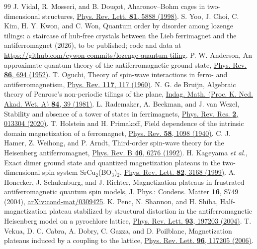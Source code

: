 \documentclass[aps,prb,twocolumn,superscriptaddress,floatfix]{revtex4-2}
\begin{document}
\begin{thebibliography}{99}
 J. Vidal, R. Mosseri, and B. Dou\c{c}ot, Aharonov--Bohm cages in two-dimensional structures, \href{https://doi.org/10.1103/PhysRevLett.81.5888}{Phys. Rev. Lett. \textbf{81}, 5888 (1998)}.
 S. Yoo, J. Choi, C. Kim, H. Y. Kwon, and C. Won, Quantum order by disorder among lozenge tilings: a staircase of hub-free crystals between the Lieb ferrimagnet and the antiferromagnet (2026), to be published; code and data at \url{https://github.com/cywon-commits/lozenge-quantum-tiling}.
 P. W. Anderson, An approximate quantum theory of the antiferromagnetic ground state, \href{https://doi.org/10.1103/PhysRev.86.694}{Phys. Rev. \textbf{86}, 694 (1952)}.
 T. Oguchi, Theory of spin-wave interactions in ferro- and antiferromagnetism, \href{https://doi.org/10.1103/PhysRev.117.117}{Phys. Rev. \textbf{117}, 117 (1960)}.
 N. G. de Bruijn, Algebraic theory of Penrose's non-periodic tilings of the plane, \href{https://doi.org/10.1016/1385-7258(81)90016-0}{Indag. Math. (Proc. K. Ned. Akad. Wet. A) \textbf{84}, 39 (1981)}.
 L. Rademaker, A. Beekman, and J. van Wezel, Stability and absence of a tower of states in ferrimagnets, \href{https://doi.org/10.1103/PhysRevResearch.2.013304}{Phys. Rev. Res. \textbf{2}, 013304 (2020)}.
 T. Holstein and H. Primakoff, Field dependence of the intrinsic domain magnetization of a ferromagnet, \href{https://doi.org/10.1103/PhysRev.58.1098}{Phys. Rev. \textbf{58}, 1098 (1940)}.
 C. J. Hamer, Z. Weihong, and P. Arndt, Third-order spin-wave theory for the Heisenberg antiferromagnet, \href{https://doi.org/10.1103/PhysRevB.46.6276}{Phys. Rev. B \textbf{46}, 6276 (1992)}.
 H. Kageyama \textit{et al.}, Exact dimer ground state and quantized magnetization plateaus in the two-dimensional spin system SrCu$_2$(BO$_3$)$_2$, \href{https://doi.org/10.1103/PhysRevLett.82.3168}{Phys. Rev. Lett. \textbf{82}, 3168 (1999)}.
 A. Honecker, J. Schulenburg, and J. Richter, Magnetization plateaus in frustrated antiferromagnetic quantum spin models, J. Phys.: Condens. Matter \textbf{16}, S749 (2004), \href{https://arxiv.org/abs/cond-mat/0309425}{arXiv:cond-mat/0309425}.
 K. Penc, N. Shannon, and H. Shiba, Half-magnetization plateau stabilized by structural distortion in the antiferromagnetic Heisenberg model on a pyrochlore lattice, \href{https://doi.org/10.1103/PhysRevLett.93.197203}{Phys. Rev. Lett. \textbf{93}, 197203 (2004)}.
 T. Vekua, D. C. Cabra, A. Dobry, C. Gazza, and D. Poilblanc, Magnetization plateaus induced by a coupling to the lattice, \href{https://doi.org/10.1103/PhysRevLett.96.117205}{Phys. Rev. Lett. \textbf{96}, 117205 (2006)}.

\end{thebibliography}
\end{document}
